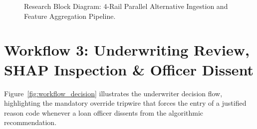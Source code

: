 \documentclass[11pt,a4paper,oneside]{report}
\begin{document}
\begin{figure}[H]
\caption{Research Block Diagram: 4-Rail Parallel Alternative Ingestion and Feature Aggregation Pipeline.}
\label{fig:workflow_ingestion}
\end{figure}

\section{Workflow 3: Underwriting Review, SHAP Inspection \& Officer Dissent}
Figure~\ref{fig:workflow_decision} illustrates the underwriter decision flow, highlighting the mandatory override tripwire that forces the entry of a justified reason code whenever a loan officer dissents from the algorithmic recommendation.
\end{document}
